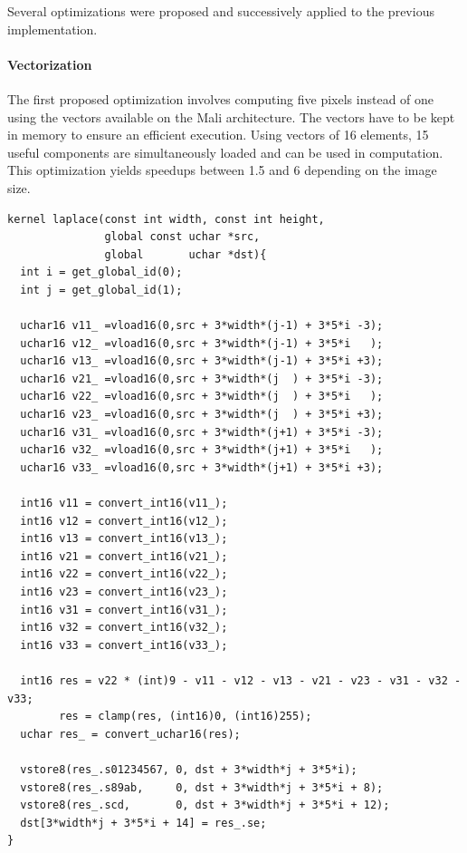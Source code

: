 \documentclass{IEEEtran}
\begin{document}
Several optimizations were proposed and successively applied to the previous
implementation.

\paragraph{Vectorization} The first proposed optimization involves computing
five pixels instead of one using the vectors available on the Mali
architecture. The vectors have to be kept in memory to ensure an efficient
execution. Using vectors of 16 elements, 15 useful components are
simultaneously loaded and can be used in computation.  This optimization yields
speedups between 1.5 and 6 depending on the image size.

\begin{lstlisting}
kernel laplace(const int width, const int height,
               global const uchar *src,
               global       uchar *dst){
  int i = get_global_id(0);
  int j = get_global_id(1);

  uchar16 v11_ =vload16(0,src + 3*width*(j-1) + 3*5*i -3);
  uchar16 v12_ =vload16(0,src + 3*width*(j-1) + 3*5*i   );
  uchar16 v13_ =vload16(0,src + 3*width*(j-1) + 3*5*i +3);
  uchar16 v21_ =vload16(0,src + 3*width*(j  ) + 3*5*i -3);
  uchar16 v22_ =vload16(0,src + 3*width*(j  ) + 3*5*i   );
  uchar16 v23_ =vload16(0,src + 3*width*(j  ) + 3*5*i +3);
  uchar16 v31_ =vload16(0,src + 3*width*(j+1) + 3*5*i -3);
  uchar16 v32_ =vload16(0,src + 3*width*(j+1) + 3*5*i   );
  uchar16 v33_ =vload16(0,src + 3*width*(j+1) + 3*5*i +3);

  int16 v11 = convert_int16(v11_);
  int16 v12 = convert_int16(v12_);
  int16 v13 = convert_int16(v13_);
  int16 v21 = convert_int16(v21_);
  int16 v22 = convert_int16(v22_);
  int16 v23 = convert_int16(v23_);
  int16 v31 = convert_int16(v31_);
  int16 v32 = convert_int16(v32_);
  int16 v33 = convert_int16(v33_);

  int16 res = v22 * (int)9 - v11 - v12 - v13 - v21 - v23 - v31 - v32 - v33;
        res = clamp(res, (int16)0, (int16)255);
  uchar res_ = convert_uchar16(res);

  vstore8(res_.s01234567, 0, dst + 3*width*j + 3*5*i);
  vstore8(res_.s89ab,     0, dst + 3*width*j + 3*5*i + 8);
  vstore8(res_.scd,       0, dst + 3*width*j + 3*5*i + 12);
  dst[3*width*j + 3*5*i + 14] = res_.se;
}
\end{lstlisting}
\end{document}
